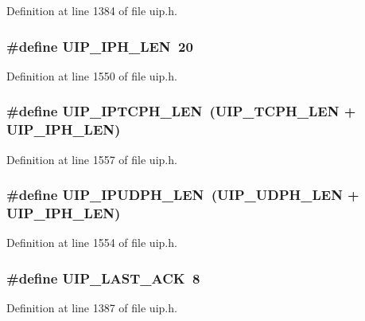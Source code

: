 Definition at line 1384 of file uip.h.

\hypertarget{group__uip_ga6bc12c6c7b56f73ce5d57abfdcdc6eb5}{
\subsubsection[{UIP\_\-IPH\_\-LEN}]{\setlength{\rightskip}{0pt plus 5cm}\#define UIP\_\-IPH\_\-LEN~20}}
\label{group__uip_ga6bc12c6c7b56f73ce5d57abfdcdc6eb5}


Definition at line 1550 of file uip.h.

\hypertarget{group__uip_ga15f2617f7dc1713f9d10282125c6027b}{
\subsubsection[{UIP\_\-IPTCPH\_\-LEN}]{\setlength{\rightskip}{0pt plus 5cm}\#define UIP\_\-IPTCPH\_\-LEN~(UIP\_\-TCPH\_\-LEN + UIP\_\-IPH\_\-LEN)}}
\label{group__uip_ga15f2617f7dc1713f9d10282125c6027b}


Definition at line 1557 of file uip.h.

\hypertarget{group__uip_ga6f2b90c597ec23f39ec716ccec11233c}{
\subsubsection[{UIP\_\-IPUDPH\_\-LEN}]{\setlength{\rightskip}{0pt plus 5cm}\#define UIP\_\-IPUDPH\_\-LEN~(UIP\_\-UDPH\_\-LEN + UIP\_\-IPH\_\-LEN)}}
\label{group__uip_ga6f2b90c597ec23f39ec716ccec11233c}


Definition at line 1554 of file uip.h.

\hypertarget{group__uip_gad135fb0cfdfb2c212f0f51865a3640e4}{
\subsubsection[{UIP\_\-LAST\_\-ACK}]{\setlength{\rightskip}{0pt plus 5cm}\#define UIP\_\-LAST\_\-ACK~8}}
\label{group__uip_gad135fb0cfdfb2c212f0f51865a3640e4}


Definition at line 1387 of file uip.h.


